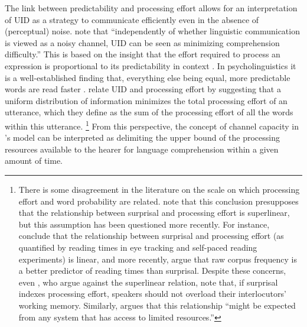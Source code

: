 The link between predictability and processing effort allows for an interpretation of UID as a strategy to communicate efficiently even in the absence of (perceptual) noise. \citet[850]{levy.jaeger2007} note that ``independently of whether linguistic communication is viewed as a noisy channel, UID can be seen as minimizing comprehension difficulty.'' This is based on the insight that the effort required to process an expression is proportional to its predictability in context \citep{hale2001, hale2016, levy2005, levy2008}. In psycholinguistics it is a well-established finding that, everything else being equal, more predictable words are read faster \citep[see e.g.][]{ehrlich.rayner1981, mcdonald.shillcock2003, demberg.keller2008, smith.levy2013}. \citet[850]{levy.jaeger2007} relate UID and processing effort by suggesting that a uniform distribution of information minimizes the total processing effort of an utterance, which they define as the sum of the processing effort of all the words within this utterance.%
%
\footnote{There is some disagreement in the literature on the scale on which processing effort and word probability are related. \citet{levy.jaeger2007} note that this conclusion presupposes that the relationship between surprisal and processing effort is superlinear, but this assumption has been questioned more recently. For instance, \citet{smith.levy2008, smith.levy2013} conclude that the relationship between surprisal and processing effort (as quantified by reading times in eye tracking and self-paced reading experiments) is linear, and more recently, \citet{brothers.kuperberg2019} argue that raw corpus frequency is a better predictor of reading times than surprisal. Despite these concerns, even \citet[311]{smith.levy2013}, who argue against the superlinear relation, note that, if surprisal indexes processing effort, speakers should not overload their interlocutors' working memory. Similarly, \citet[51]{jaeger2010} argues that this relationship ``might be expected from any system that has access to limited resources.''
}\afterfn%
%
From this perspective, the concept of channel capacity in \citeauthor{shannon1948}'s model can be interpreted as delimiting the upper bound of the processing resources available to the hearer for language comprehension within a given amount of time.%
